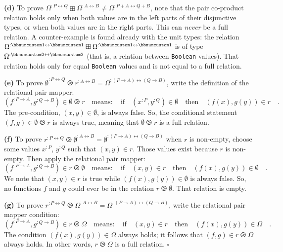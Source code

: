 \textbf{(d)} To prove $\Omega^{:P\leftrightarrow Q}\boxplus\Omega^{:A\leftrightarrow B}\neq\Omega^{:P+A\leftrightarrow Q+B}$,
note that the pair co-product relation holds only when both values
are in the left parts of their disjunctive types, or when both values
are in the right parts. This can \emph{never} be a full relation.
A counter-example is found already with the unit types: the relation
$\Omega^{:\bbnum 1\leftrightarrow\bbnum 1}\boxplus\Omega^{:\bbnum 1\leftrightarrow\bbnum 1}$
is of type $\Omega^{:\bbnum 2\leftrightarrow\bbnum 2}$ (that is,
a relation between \lstinline!Boolean! values). That relation holds
only for equal \lstinline!Boolean! values and is not equal to a full
relation.

\textbf{(e)} To prove $\emptyset^{:P\leftrightarrow Q}\ogreaterthan r^{:A\leftrightarrow B}=\Omega^{:(P\rightarrow A)\leftrightarrow(Q\rightarrow B)}$,
write the definition of the relational pair mapper:
\[
(f^{:P\rightarrow A},g^{:Q\rightarrow B})\in\emptyset\ogreaterthan r\quad\text{means}:\quad\text{if}\quad(x^{:P},y^{:Q})\in\emptyset\quad\text{then}\quad(f(x),g(y))\in r\quad.
\]
The pre-condition, $(x,y)\in\emptyset$, is always false. So, the
conditional statement $(f,g)\in\emptyset\ogreaterthan r$ is always
true, meaning that $\emptyset\ogreaterthan r$ is a full relation. 

\textbf{(f)} To prove $r^{:P\leftrightarrow Q}\ogreaterthan\emptyset^{:A\leftrightarrow B}=\emptyset^{:(P\rightarrow A)\leftrightarrow(Q\rightarrow B)}$
when $r$ is non-empty, choose some values $x^{:P}$, $y^{:Q}$ such
that $(x,y)\in r$. Those values exist because $r$ is non-empty.
Then apply the relational pair mapper:
\[
(f^{:P\rightarrow A},g^{:Q\rightarrow B})\in r\ogreaterthan\emptyset\quad\text{means}:\quad\text{if}\quad(x,y)\in r\quad\text{then}\quad(f(x),g(y))\in\emptyset\quad.
\]
We note that $(x,y)\in r$ is true while $(f(x),g(y))\in\emptyset$
is always false. So, no functions $f$ and $g$ could ever be in the
relation $r\ogreaterthan\emptyset$. That relation is empty.

\textbf{(g)} To prove $r^{:P\leftrightarrow Q}\ogreaterthan\Omega^{:A\leftrightarrow B}=\Omega^{:(P\rightarrow A)\leftrightarrow(Q\rightarrow B)}$,
write the relational pair mapper condition:
\[
(f^{:P\rightarrow A},g^{:Q\rightarrow B})\in r\ogreaterthan\Omega\quad\text{means}:\quad\text{if}\quad(x,y)\in r\quad\text{then}\quad(f(x),g(y))\in\Omega\quad.
\]
The condition $(f(x),g(y))\in\Omega$ always holds; it follows that
$(f,g)\in r\ogreaterthan\Omega$ always holds. In other words, $r\ogreaterthan\Omega$
is a full relation. $\square$

